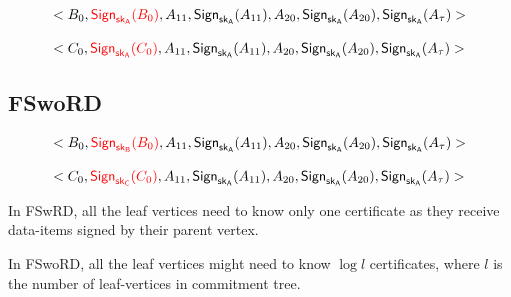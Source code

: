 \documentclass[%
  slidesonly,%
  semlayer%
  ]{seminar}                                  %
\newcommand{\sk}{\sf{sk}}
\begin{document}
\begin{slide}
        \begin{equation*}
          \begin{array}{l}
            <B_{0}, \textcolor{red}{\textsf{Sign}_{\sk_{A}}(B_{0})},A_{11},\textsf{Sign}_{\sk_{A}}(A_{11}),A_{20},\textsf{Sign}_{\sk_{A}}(A_{20}),\textsf{Sign}_{\sk_{A}}(A_{\tau})>\\
              \\
            <C_{0}, \textcolor{red}{\textsf{Sign}_{\sk_{A}}(C_{0})},A_{11},\textsf{Sign}_{\sk_{A}}(A_{11}),A_{20},\textsf{Sign}_{\sk_{A}}(A_{20}),\textsf{Sign}_{\sk_{A}}(A_{\tau})>\\ 
          \end{array}
        \end{equation*}
        \vfill
        \clearpage

    \subsection*{FSwoRD}
        \begin{equation*}
          \begin{array}{l}
            <B_{0}, \textcolor{red}{\textsf{Sign}_{\sk_{B}}(B_{0})},A_{11},\textsf{Sign}_{\sk_{A}}(A_{11}),A_{20},\textsf{Sign}_{\sk_{A}}(A_{20}),\textsf{Sign}_{\sk_{A}}(A_{\tau})>\\
              \\
            <C_{0}, \textcolor{red}{\textsf{Sign}_{\sk_{C}}(C_{0})},A_{11},\textsf{Sign}_{\sk_{A}}(A_{11}),A_{20},\textsf{Sign}_{\sk_{A}}(A_{20}),\textsf{Sign}_{\sk_{A}}(A_{\tau})>\\ 
          \end{array}
        \end{equation*}

        In FSwRD, all the leaf vertices need to know only one certificate as they receive data-items signed by their parent vertex.

        In FSwoRD, all the leaf vertices might need to know $\log l$ certificates, where $l$ is the number of leaf-vertices in commitment tree.
        \vfill
        \clearpage


\end{slide}
\end{document}
